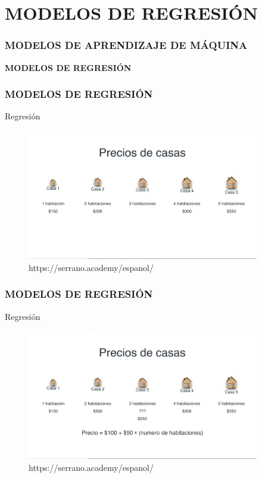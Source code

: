 \documentclass{beamer}
\begin{document}
\section{MODELOS DE REGRESIÓN}

\begin{frame}
			\frametitle{MODELOS DE APRENDIZAJE DE MÁQUINA}
	\begin{block}{}	
		\center
		\textbf{MODELOS DE REGRESIÓN}
	\end{block}
\end{frame}


\begin{frame}
	\frametitle{MODELOS DE REGRESIÓN}
\begin{block}{Regresión}	
		\begin{figure}
			\includegraphics[width=0.9\textwidth]{imagenes_regresion/IMG_3483.jpg}
			\caption{https://serrano.academy/espanol/}
		\end{figure}
	\end{block}
\end{frame}

\begin{frame}
	\frametitle{MODELOS DE REGRESIÓN}
	\begin{block}{Regresión}	
		\begin{figure}
			\includegraphics[width=0.9\textwidth]{imagenes_regresion/IMG_3483_1.jpeg}
			\caption{https://serrano.academy/espanol/}
		\end{figure}
	\end{block}
\end{frame}
\end{document}
